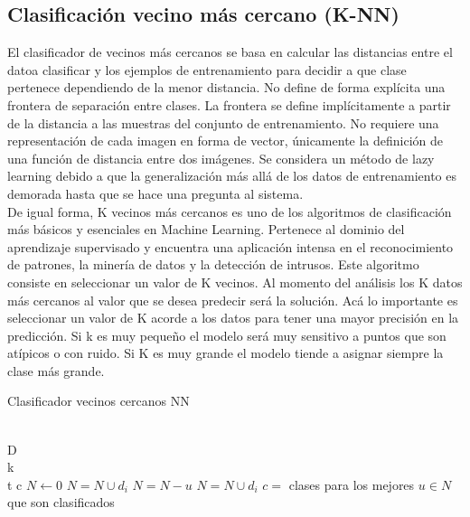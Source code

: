 \documentclass[conference]{IEEEtran}
\begin{document}
\subsection{Clasificación vecino más cercano (K-NN)}
El clasificador de vecinos más cercanos se basa en calcular las distancias entre el datoa  clasificar y los ejemplos de entrenamiento para decidir a que clase pertenece dependiendo de la menor distancia. No define de forma explícita una frontera de separación entre clases. La frontera se define implícitamente a partir de la distancia a las muestras del conjunto de entrenamiento. No requiere una representación de cada imagen en forma de vector, únicamente la definición de una función de distancia entre dos imágenes. Se considera un método de lazy learning debido a que la generalización más allá de los datos de entrenamiento es demorada hasta que se hace una pregunta al sistema.\\

De igual forma, K vecinos más cercanos es uno de los algoritmos de clasificación más básicos y esenciales en Machine Learning. Pertenece al dominio del aprendizaje supervisado y encuentra una aplicación intensa en el reconocimiento de patrones, la minería de datos y la detección de intrusos. Este algoritmo consiste en seleccionar un valor de K vecinos. Al momento del análisis los K datos más cercanos al valor que se desea predecir será la solución. Acá lo importante es seleccionar un valor de K acorde a los datos para tener una mayor precisión en la predicción. Si k es muy pequeño el modelo será muy sensitivo a puntos que son atípicos o con ruido. Si K es muy grande el modelo tiende a asignar siempre la clase más grande.

\begin{algorithm}[H]
\caption{Clasificador vecinos cercanos NN}
\begin{algorithmic}
\Require \\D {}\\
k \\
t 
\Ensure c 
\State $N \gets 0$
    \State $N=N \cup d_i$
\Else
    	\State $N=N-u$
    	\State $N=N\cup d_i$
    \EndIf
\EndIf
\EndFor
\State $c=$ clases para los mejores $u \in N$ que son clasificados 
\end{algorithmic}
\end{algorithm}
\end{document}
